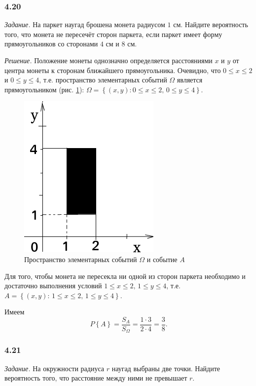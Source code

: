 \subsubsection*{4.20}

\textit{Задание.} На паркет наугад брошена монета радиусом $1$ см.
Найдите вероятность того, что монета не пересечёт сторон паркета, если паркет имеет форму прямоугольников со сторонами $4$ см и $8$ см.

\textit{Решение.} Положение монеты однозначно определяется расстояниями $x$ и $y$ от центра монеты к сторонам ближайшего прямоугольника.
Очевидно, что $0 \leq x \leq 2$ и $0 \leq y \leq 4$, т.е. пространство элементарных событий $ \Omega $ является прямоугольником (рис. \ref{fig:420}):
$ \Omega =
\left\{ \left( x, y \right): 0 \leq x \leq 2, \, 0 \leq y \leq 4 \right\}$.

\begin{figure}[h!]
  \centering
  \includegraphics[width=.5\textwidth]{./pictures/4_20.png}
  \caption{Пространство элементарных событий $ \Omega $ и событие $A$}
  \label{fig:420}
\end{figure}

Для того,
чтобы монета не пересекла ни одной из сторон паркета необходимо и достаточно выполнения условий
$1 \leq x \leq 2, \, 1 \leq y \leq 4$, т.е. $A = \left\{ \left( x, y \right): \, 1 \leq x \leq 2, \, 1 \leq y \leq 4 \right\} $.

Имеем
$$P \left\{ A \right\} =
\frac{S_A}{S_{ \Omega }} =
\frac{1 \cdot 3}{2 \cdot 4} =
\frac{3}{8}.$$

\subsubsection*{4.21}

\textit{Задание.} На окружности радиуса $r$ наугад выбраны две точки.
Найдите вероятность того, что расстояние между ними не превышает $r$.

